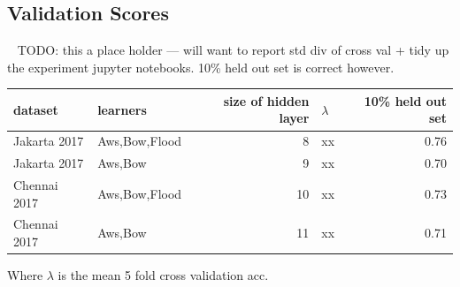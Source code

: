 
\subsection{Validation Scores}~\label{chap4:ensemble_scores}
TODO: this a place holder --- will want to report std div of cross val + tidy up
the experiment jupyter notebooks. 10\% held out set is correct however.
\begin{table}
\centering
\begin{tabular}{llrlr}
\toprule
      dataset &       learners &  size of hidden layer & $\lambda{}$ &  10\% held out set \\
\hline
 Jakarta 2017 &  Aws,Bow,Flood &                     8 &                                xx &              0.76 \\
\midrule
 Jakarta 2017 &        Aws,Bow &                     9 &                                xx &              0.70 \\
 Chennai 2017 &  Aws,Bow,Flood &                    10 &                                xx &              0.73 \\
 Chennai 2017 &        Aws,Bow &                    11 &                                xx &              0.71 \\
\bottomrule
\end{tabular}
\end{table}

Where $\lambda{}$ is the mean 5 fold cross validation acc.
